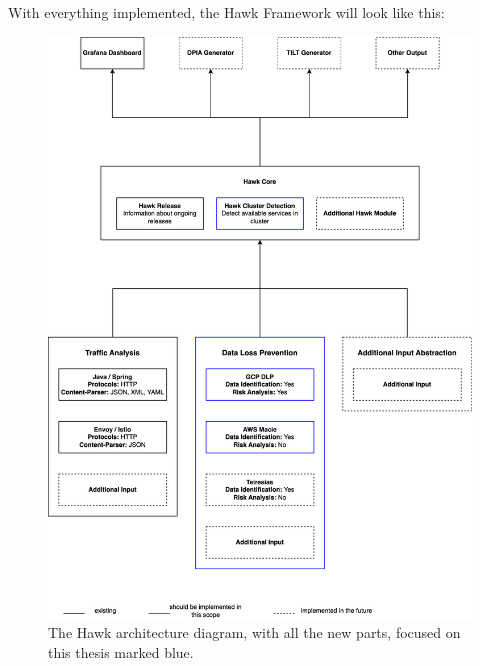 With everything implemented, the Hawk Framework will look like this:
\begin{figure}[!htb]
  \centering

  \includegraphics[width=0.95\columnwidth]{hawk.png}

  \caption[Hawk architecture]{The Hawk architecture diagram, with all the new parts, focused on this thesis marked blue.}  
  \label{fig:hawk}
\end{figure}




